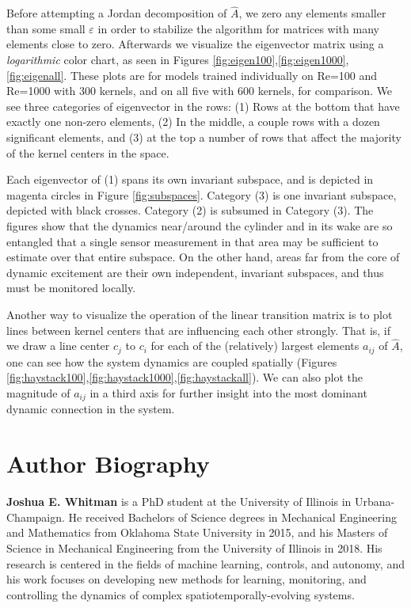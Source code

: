 \documentclass[letterpaper,12pt,peerreviewca,draftcls]{IEEEtran}
\newcommand{\dualop}{A}
\newcommand{\dualopApprox}{\widehat{\dualop}}
\begin{document}
Before attempting a Jordan decomposition of $\dualopApprox$, we zero any elements smaller than some small $\varepsilon$ in order to stabilize the algorithm for matrices with many elements close to zero. Afterwards we visualize the eigenvector matrix using a \emph{logarithmic} color chart, as seen in Figures \ref{fig:eigen100},\ref{fig:eigen1000},\ref{fig:eigenall}. These plots are for models trained individually on Re=100 and Re=1000 with 300 kernels, and on all five with 600 kernels, for comparison. We see three categories of eigenvector in the rows: (1) Rows at the bottom that have exactly one non-zero elements, (2) In the middle, a couple rows with a dozen significant elements, and (3) at the top a number of rows that affect the majority of the kernel centers in the space.

Each eigenvector of (1) spans its own invariant subspace, and is depicted in magenta circles in Figure \ref{fig:subspaces}. Category (3) is one invariant subspace, depicted with black crosses. Category (2) is subsumed in Category (3). The figures show that the dynamics near/around the cylinder and in its wake are so entangled that a single sensor measurement in that area may be sufficient to estimate over that entire subspace. On the other hand, areas far from the core of dynamic excitement are their own independent, invariant subspaces, and thus must be monitored locally.

Another way to visualize the operation of the linear transition matrix is to plot lines between kernel centers that are influencing each other strongly. That is, if we draw a line center $c_j$ to $c_i$ for each of the (relatively) largest elements $a_{ij}$ of $\dualopApprox$, one can see how the system dynamics are coupled spatially (Figures \ref{fig:haystack100},\ref{fig:haystack1000},\ref{fig:haystackall}). We can also plot the magnitude of $a_{ij}$ in a third axis for further insight into the most dominant dynamic connection in the system.


\processdelayedfloats






\newpage
\section{Author Biography}

\noindent \textbf{Joshua E. Whitman} is a PhD student at the University of Illinois in Urbana-Champaign. He received Bachelors of Science degrees in Mechanical Engineering and Mathematics from Oklahoma State University in 2015, and his Masters of Science in Mechanical Engineering from the University of Illinois in 2018. His research is centered in the fields of machine learning, controls, and autonomy, and his work focuses on developing new methods for learning, monitoring, and controlling the dynamics of complex spatiotemporally-evolving systems.
\end{document}
